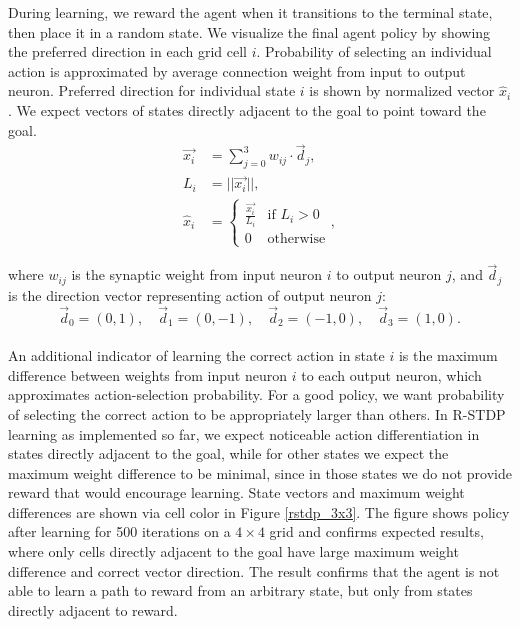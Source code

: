 \documentclass[a4paper,12pt,openright]{book}
\begin{document}
During learning, we reward the agent when it transitions to the terminal state, then place it in a random state. We visualize the final agent policy by showing the preferred direction in each grid cell $i$. Probability of selecting an individual action is approximated by average connection weight from input to output neuron. Preferred direction for individual state $i$ is shown by normalized vector $\hat{x}_i$. We expect vectors of states directly adjacent to the goal to point toward the goal.
\[
\begin{aligned}
    \overrightarrow{x_i} &= \sum_{j=0}^{3} w_{ij} \cdot \overrightarrow{d}_j, \\
    L_i &= ||\overrightarrow{x_i}||, \\
    \hat{x}_i &= \begin{cases} \frac{\overrightarrow{x_i}}{L_i} & \text{if } L_i > 0 \\
        0 & \text{otherwise}
    \end{cases},
\end{aligned}
\]

\noindent
where \(w_{ij}\) is the synaptic weight from input neuron \(i\) to output neuron \(j\), and $\overrightarrow{d}_j$ is the direction vector representing action of output neuron \(j\):
\[
\overrightarrow{d}_0 = (0,1), \quad
\overrightarrow{d}_1 = (0,-1), \quad
\overrightarrow{d}_2 = (-1,0), \quad
\overrightarrow{d}_3 = (1,0).
\]
\\
An additional indicator of learning the correct action in state $i$ is the maximum difference between weights from input neuron $i$ to each output neuron, which approximates action-selection probability. For a good policy, we want probability of selecting the correct action to be appropriately larger than others. In R-STDP learning as implemented so far, we expect noticeable action differentiation in states directly adjacent to the goal, while for other states we expect the maximum weight difference to be minimal, since in those states we do not provide reward that would encourage learning. State vectors and maximum weight differences are shown via cell color in Figure \ref{rstdp_3x3}. The figure shows policy after learning for 500 iterations on a $4 \times 4$ grid and confirms expected results, where only cells directly adjacent to the goal have large maximum weight difference and correct vector direction. The result confirms that the agent is not able to learn a path to reward from an arbitrary state, but only from states directly adjacent to reward.
\end{document}
